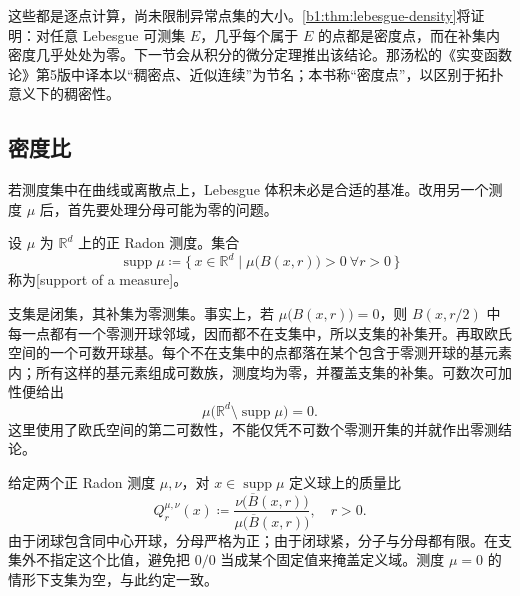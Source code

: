这些都是逐点计算，尚未限制异常点集的大小。\cref{b1:thm:lebesgue-density}将证明：对任意 Lebesgue 可测集 \(E\)，几乎每个属于 \(E\) 的点都是密度点，而在补集内密度几乎处处为零。下一节会从积分的微分定理推出该结论。那汤松的《实变函数论》第5版中译本\cite[第九章, 第6节]{Natanson2010RealChinese}以“稠密点、近似连续”为节名；本书称“密度点”，以区别于拓扑意义下的稠密性。

\subsection{密度比}
\label{b1:subsec:140102}

若测度集中在曲线或离散点上，Lebesgue 体积未必是合适的基准。改用另一个测度 \(\mu\) 后，首先要处理分母可能为零的问题。

\begin{definition}
\label{b1:def:measure-support}
设 \(\mu\) 为 \(\mathbb R^d\) 上的正 Radon 测度。集合
\[
\operatorname{supp}\mu
\coloneqq\{\,x\in\mathbb R^d\mid \mu\bigl(B(x,r)\bigr)>0\ \forall r>0\,\}
\]
称为[support of a measure]。
\end{definition}

支集是闭集，其补集为零测集。事实上，若 \(\mu\bigl(B(x,r)\bigr)=0\)，则 \(B(x,r/2)\) 中每一点都有一个零测开球邻域，因而都不在支集中，所以支集的补集开。再取欧氏空间的一个可数开球基。每个不在支集中的点都落在某个包含于零测开球的基元素内；所有这样的基元素组成可数族，测度均为零，并覆盖支集的补集。可数次可加性便给出
\[
\mu\bigl(\mathbb R^d\setminus\operatorname{supp}\mu\bigr)=0.
\]
这里使用了欧氏空间的第二可数性，不能仅凭不可数个零测开集的并就作出零测结论。

\ProseParagraphBreak

给定两个正 Radon 测度 \(\mu,\nu\)，对 \(x\in\operatorname{supp}\mu\) 定义球上的质量比
\[
Q_r^{\mu,\nu}(x)
\coloneqq\frac{\nu\bigl(\overline B(x,r)\bigr)}{\mu\bigl(\overline B(x,r)\bigr)},
\quad r>0.
\]
由于闭球包含同中心开球，分母严格为正；由于闭球紧，分子与分母都有限。在支集外不指定这个比值，避免把 \(0/0\) 当成某个固定值来掩盖定义域。测度 \(\mu=0\) 的情形下支集为空，与此约定一致。

